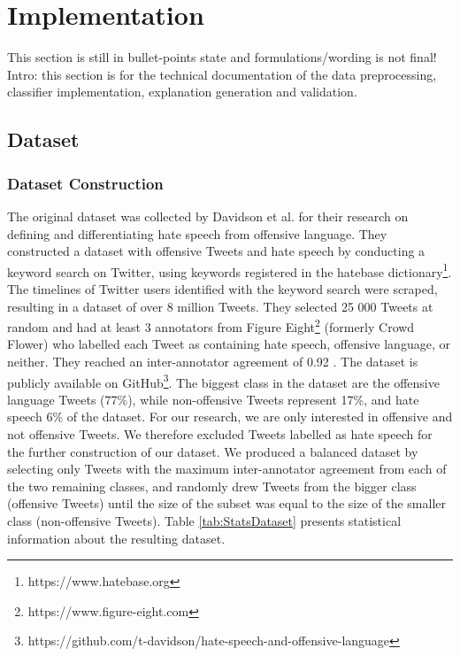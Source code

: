 \section{Implementation}
{\color{blue}This section is still in bullet-points state and formulations/wording is not final!}\medskip \newline
Intro: this section is for the technical documentation of the data preprocessing, classifier implementation, explanation generation and validation. 


\subsection{Dataset}

\subsubsection{Dataset Construction}
The original dataset was collected by Davidson et al. \cite{davidson2017automated} for their research on defining and differentiating hate speech from offensive language. They constructed a dataset with offensive Tweets and hate speech by conducting a keyword search on Twitter, using keywords registered in the hatebase dictionary\footnote{https://www.hatebase.org}. The timelines of Twitter users identified with the keyword search were scraped, resulting in a dataset of over 8 million Tweets. They selected 25 000 Tweets at random and had at least 3 annotators from Figure Eight\footnote{https://www.figure-eight.com} (formerly Crowd Flower) who labelled each Tweet as containing hate speech, offensive language, or neither. They reached an inter-annotator agreement of 0.92 \cite{davidson2017automated}. The dataset is publicly available on GitHub\footnote{https://github.com/t-davidson/hate-speech-and-offensive-language}.\newline
The biggest class in the dataset are the offensive language Tweets (77\%), while non-offensive Tweets represent 17\%, and hate speech 6\% of the dataset. \newline
For our research, we are only interested in offensive and not offensive Tweets. We therefore excluded Tweets labelled as hate speech for the further construction of our dataset. We produced a balanced dataset by selecting only Tweets with the maximum inter-annotator agreement from each of the two remaining classes, and randomly drew Tweets from the bigger class (offensive Tweets) until the size of the subset was equal to the size of the smaller class (non-offensive Tweets). Table \ref{tab:StatsDataset} presents statistical information about the resulting dataset.

